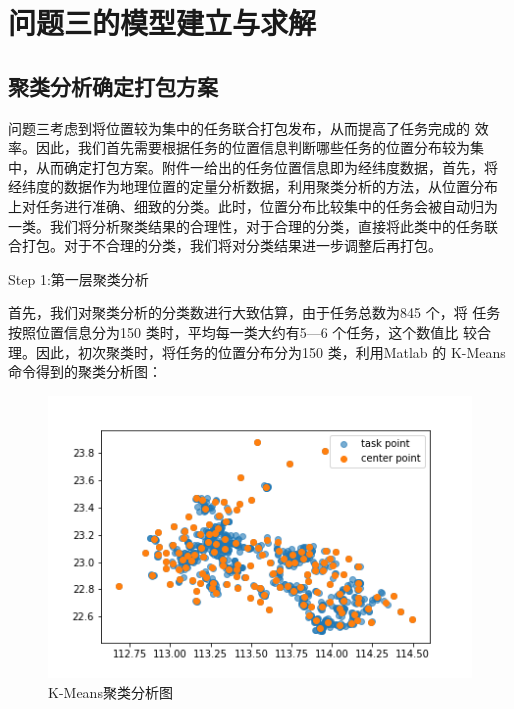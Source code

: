 \section{问题三的模型建立与求解}
\subsection{聚类分析确定打包方案}
问题三考虑到将位置较为集中的任务联合打包发布，从而提高了任务完成的
效率。因此，我们首先需要根据任务的位置信息判断哪些任务的位置分布较为集
中，从而确定打包方案。附件一给出的任务位置信息即为经纬度数据，首先，将
经纬度的数据作为地理位置的定量分析数据，利用聚类分析的方法，从位置分布
上对任务进行准确、细致的分类。此时，位置分布比较集中的任务会被自动归为
一类。我们将分析聚类结果的合理性，对于合理的分类，直接将此类中的任务联
合打包。对于不合理的分类，我们将对分类结果进一步调整后再打包。

Step 1:第一层聚类分析

首先，我们对聚类分析的分类数进行大致估算，由于任务总数为845 个，将
任务按照位置信息分为150 类时，平均每一类大约有5—6 个任务，这个数值比
较合理。因此，初次聚类时，将任务的位置分布分为150 类，利用Matlab 的
K-Means 命令得到的聚类分析图：

\begin{figure}[H]
    \centering
    \includegraphics[width=1\textwidth]{150.png}
    \caption{K-Means聚类分析图}
    \label{}
\end{figure}

